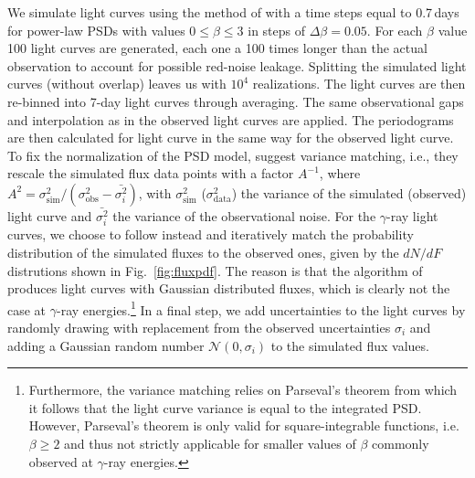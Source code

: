 \documentclass[twocolumn,linenumbers]{aastex62}
\newcommand{\gray}{$\gamma$-ray\xspace}
\begin{document}
We simulate light curves using the method of \citet{1995A&A...300..707T} with a time steps equal to 0.7\,days for power-law PSDs with values $0 \leqslant \beta \leqslant 3$ in steps of $\Delta\beta = 0.05$. For each $\beta$ value 100 light curves are generated, each one a 100 times longer than the actual observation to account for possible red-noise leakage. Splitting the simulated light curves (without overlap) leaves us with $10^4$ realizations. 
The light curves are then re-binned into 7-day light curves through averaging. The same observational gaps and interpolation as in the observed light curves are applied. 
The periodograms are then calculated for light curve in the same way for the observed light curve.
To fix the normalization of the PSD model, \citet{2014MNRAS.445..437M} suggest variance matching, i.e., they rescale the simulated flux data points with a factor $A^{-1}$, where $A^2 = \sigma_\mathrm{sim}^2 / (\sigma_\mathrm{obs}^2 - \bar{\sigma_i^2})$, with $\sigma_\mathrm{sim}^2$ ($\sigma_\mathrm{data}^2$) the variance of the simulated (observed) light curve and $\bar{\sigma_i^2}$ the variance of the observational noise.
For the \gray light curves, we choose to follow \citet{2013MNRAS.433..907E} instead and iteratively match the probability distribution of the simulated fluxes to the observed ones, given by the $dN/dF$ distrutions shown in Fig.~\ref{fig:fluxpdf}. 
The reason is that the algorithm of \citet{1995A&A...300..707T} produces light curves with Gaussian distributed fluxes, which is clearly not the case at \gray energies.\footnote{Furthermore, the variance matching relies on Parseval's theorem from which it follows that the light curve variance is equal to the integrated PSD. However, Parseval's theorem is only valid for square-integrable functions, i.e. $\beta \geqslant 2$ and thus not strictly applicable for smaller values of $\beta$ commonly observed at \gray energies.}
In a final step, we add uncertainties to the light curves by randomly drawing with replacement from the observed uncertainties $\sigma_i$ and adding a Gaussian random number $\mathcal{N}(0,\sigma_i)$ to the simulated flux values.
\end{document}
